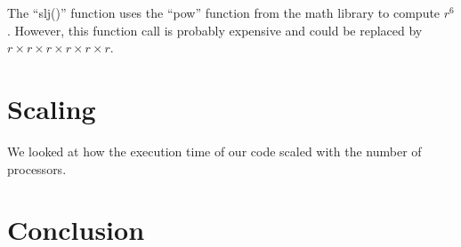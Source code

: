 \documentclass[10pt]{article}
\begin{document}
The ``slj()'' function uses the ``pow'' function from the math library to compute $r^6$.
%
However, this function call is probably expensive and could be replaced by $r \times r \times r \times r \times r \times r$.
%


\section{Scaling}
We looked at how the execution time of our code scaled with the number of processors.

\section{Conclusion}
\end{document}

